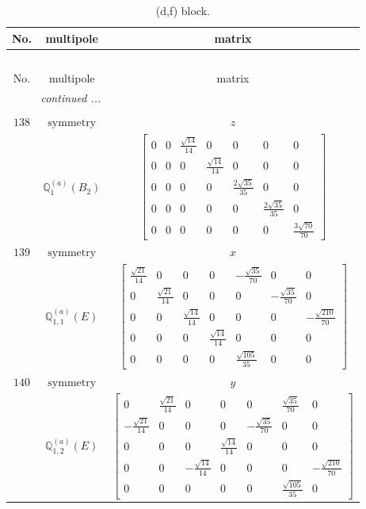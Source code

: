 \documentclass[fleqn,8pt,landscape]{jsarticle}
\begin{document}
\begin{longtable}{ccc}
\caption{(d,f) block.}
 \\
 \hline \hline
No. & multipole & matrix \\ \hline \endfirsthead

\multicolumn{2}{l}{\tablename\ \thetable{}} \\
 \hline \hline
No. & multipole & matrix \\ \hline \endhead

 \hline \hline
\multicolumn{2}{r}{\footnotesize\it continued ...} \\ \endfoot

 \hline \hline
\multicolumn{2}{r}{} \\ \endlastfoot

$ 138 $ & $ \text{symmetry} $ & $ z $ \\
$  $ & $ \mathbb{Q}_{1}^{(a)}(B_{2}) $ & $ \begin{bmatrix} 0 & 0 & \frac{\sqrt{14}}{14} & 0 & 0 & 0 & 0 \\ 0 & 0 & 0 & \frac{\sqrt{14}}{14} & 0 & 0 & 0 \\ 0 & 0 & 0 & 0 & \frac{2 \sqrt{35}}{35} & 0 & 0 \\ 0 & 0 & 0 & 0 & 0 & \frac{2 \sqrt{35}}{35} & 0 \\ 0 & 0 & 0 & 0 & 0 & 0 & \frac{3 \sqrt{70}}{70} \end{bmatrix} $ \\ \hline
$ 139 $ & $ \text{symmetry} $ & $ x $ \\
$  $ & $ \mathbb{Q}_{1,1}^{(a)}(E) $ & $ \begin{bmatrix} \frac{\sqrt{21}}{14} & 0 & 0 & 0 & - \frac{\sqrt{35}}{70} & 0 & 0 \\ 0 & \frac{\sqrt{21}}{14} & 0 & 0 & 0 & - \frac{\sqrt{35}}{70} & 0 \\ 0 & 0 & \frac{\sqrt{14}}{14} & 0 & 0 & 0 & - \frac{\sqrt{210}}{70} \\ 0 & 0 & 0 & \frac{\sqrt{14}}{14} & 0 & 0 & 0 \\ 0 & 0 & 0 & 0 & \frac{\sqrt{105}}{35} & 0 & 0 \end{bmatrix} $ \\ \hline
$ 140 $ & $ \text{symmetry} $ & $ y $ \\
$  $ & $ \mathbb{Q}_{1,2}^{(a)}(E) $ & $ \begin{bmatrix} 0 & \frac{\sqrt{21}}{14} & 0 & 0 & 0 & \frac{\sqrt{35}}{70} & 0 \\ - \frac{\sqrt{21}}{14} & 0 & 0 & 0 & - \frac{\sqrt{35}}{70} & 0 & 0 \\ 0 & 0 & 0 & \frac{\sqrt{14}}{14} & 0 & 0 & 0 \\ 0 & 0 & - \frac{\sqrt{14}}{14} & 0 & 0 & 0 & - \frac{\sqrt{210}}{70} \\ 0 & 0 & 0 & 0 & 0 & \frac{\sqrt{105}}{35} & 0 \end{bmatrix} $ \\ \hline

\end{longtable}
\end{document}
